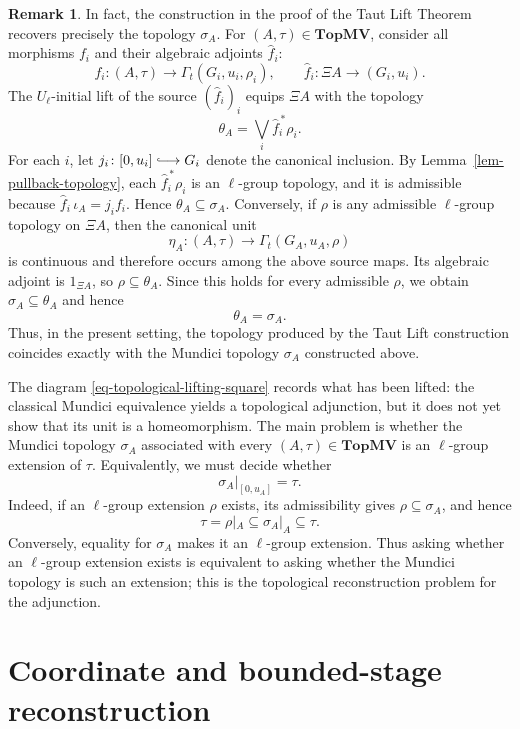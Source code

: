 \documentclass[preprint,3p]{elsarticle}
\theoremstyle{plain}
\theoremstyle{definition}
\newtheorem{rem}[thm]{Remark}
\newcommand{\longhookrightarrow}{\lhook\joinrel\longrightarrow}
\newcommand{\TopMV}{\mathbf{TopMV}}
\numberwithin{equation}{section}
\begin{document}
\begin{rem}
In fact, the construction in the proof of the Taut Lift Theorem
recovers precisely the topology $\sigma_A$.  
For $(A,\tau)\in\TopMV$, consider all morphisms $f_i$
and their algebraic adjoints $\widehat f_i$:
\[
 f_i\colon(A,\tau)\longrightarrow\Gamma_t(G_i,u_i,\rho_i),
 \qquad
 \widehat f_i\colon\Xi A\longrightarrow(G_i,u_i).
\]
The $U_{\ell}$-initial lift of the source $(\widehat f_i)_i$
equips $\Xi A$ with the topology
\[
 \theta_A=\bigvee_i\widehat f_i^{\,*}\rho_i.
\]
For each $i$, let $j_i\colon[0,u_i]\longhookrightarrow G_i$
denote the canonical inclusion.  By
Lemma~\ref{lem-pullback-topology}, each
$\widehat f_i^{\,*}\rho_i$ is an $\ell$-group topology, and it is
admissible because $\widehat f_i\,\iota_A=j_i f_i$.
Hence $\theta_A\subseteq\sigma_A$.
Conversely, if $\rho$ is any admissible $\ell$-group topology on
$\Xi A$, then the canonical unit
\[
 \eta_A\colon(A,\tau)\longrightarrow
 \Gamma_t(G_A,u_A,\rho)
\]
is continuous and therefore occurs among the above source maps.  Its
algebraic adjoint is $1_{\Xi A}$, so
$\rho\subseteq\theta_A$.  Since this holds for every admissible
$\rho$, we obtain $\sigma_A\subseteq\theta_A$ and hence
\[
 \theta_A=\sigma_A.
\]
Thus, in the present setting, the topology produced by the Taut Lift
construction coincides exactly with the Mundici topology
$\sigma_A$ constructed above.
\end{rem}

The diagram \eqref{eq-topological-lifting-square} records what has
been lifted: the classical Mundici equivalence yields a topological
adjunction, but it does not yet show that its unit is a homeomorphism.
The main problem is whether the Mundici topology $\sigma_A$
associated with every $(A,\tau)\in\TopMV$ is an $\ell$-group extension
of $\tau$.  Equivalently, we must decide whether
\[
 \sigma_A|_{[0,u_A]}=\tau.
\]
Indeed, if an $\ell$-group extension $\rho$ exists, its
admissibility gives $\rho\subseteq\sigma_A$, and hence
\[
 \tau=\rho|_A\subseteq\sigma_A|_A\subseteq\tau.
\]
Conversely, equality for $\sigma_A$ makes it an $\ell$-group
extension.  Thus asking whether an $\ell$-group extension exists is
equivalent to asking whether the Mundici topology is such an extension;
this is the topological reconstruction problem for the adjunction.

\section{Coordinate and bounded-stage reconstruction}
\label{sec-coordinate-bounded-reconstruction}
\end{document}
